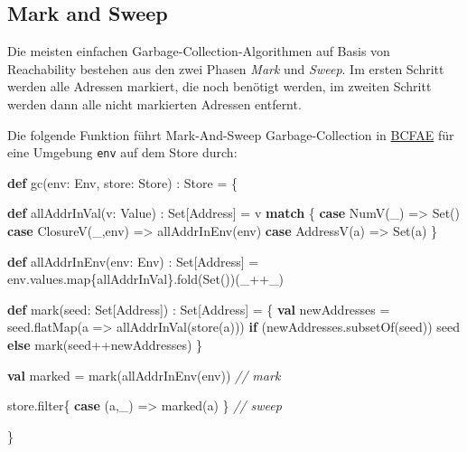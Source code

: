 \documentclass[]{article}
\newenvironment{Shaded}{}{}
\newcommand{\CommentTok}[1]{\textcolor[rgb]{0.38,0.63,0.69}{\textit{#1}}}
\newcommand{\FunctionTok}[1]{\textcolor[rgb]{0.02,0.16,0.49}{#1}}
\newcommand{\KeywordTok}[1]{\textcolor[rgb]{0.00,0.44,0.13}{\textbf{#1}}}
\newcommand{\NormalTok}[1]{#1}
\begin{document}
\hypertarget{mark-and-sweep}{%
\subsection{Mark and Sweep}\label{mark-and-sweep}}

Die meisten einfachen Garbage-Collection-Algorithmen auf Basis von
Reachability bestehen aus den zwei Phasen \emph{Mark} und \emph{Sweep}.
Im ersten Schritt werden alle Adressen markiert, die noch benötigt
werden, im zweiten Schritt werden dann alle nicht markierten Adressen
entfernt.

Die folgende Funktion führt Mark-And-Sweep Garbage-Collection in
\protect\hyperlink{mutation-bcfae}{BCFAE} für eine Umgebung \texttt{env}
auf dem Store durch:

\begin{Shaded}
\begin{Highlighting}[]
\KeywordTok{def} \FunctionTok{gc}\NormalTok{(env: Env, store: Store) : Store = \{}

  \KeywordTok{def} \FunctionTok{allAddrInVal}\NormalTok{(v: Value) : Set[Address] = v }\KeywordTok{match}\NormalTok{ \{}
    \KeywordTok{case} \FunctionTok{NumV}\NormalTok{(\_) =\textgreater{} Set()}
    \KeywordTok{case} \FunctionTok{ClosureV}\NormalTok{(\_,env) =\textgreater{} }\FunctionTok{allAddrInEnv}\NormalTok{(env)}
    \KeywordTok{case} \FunctionTok{AddressV}\NormalTok{(a) =\textgreater{} Set(a)}
\NormalTok{  \}}

  \KeywordTok{def} \FunctionTok{allAddrInEnv}\NormalTok{(env: Env) : Set[Address] =}
\NormalTok{    env.}\FunctionTok{values}\NormalTok{.}\FunctionTok{map}\NormalTok{\{allAddrInVal\}.}\FunctionTok{fold}\NormalTok{(Set())(\_++\_)}

  \KeywordTok{def} \FunctionTok{mark}\NormalTok{(seed: Set[Address]) : Set[Address] = \{}
    \KeywordTok{val}\NormalTok{ newAddresses = seed.}\FunctionTok{flatMap}\NormalTok{(a =\textgreater{} }\FunctionTok{allAddrInVal}\NormalTok{(}\FunctionTok{store}\NormalTok{(a)))}
    \KeywordTok{if}\NormalTok{ (newAddresses.}\FunctionTok{subsetOf}\NormalTok{(seed)) seed }\KeywordTok{else} \FunctionTok{mark}\NormalTok{(seed++newAddresses)}
\NormalTok{  \}}

  \KeywordTok{val}\NormalTok{ marked = }\FunctionTok{mark}\NormalTok{(}\FunctionTok{allAddrInEnv}\NormalTok{(env)) }\CommentTok{// mark}
  
\NormalTok{  store.}\FunctionTok{filter}\NormalTok{\{ }\KeywordTok{case}\NormalTok{ (a,\_) =\textgreater{} }\FunctionTok{marked}\NormalTok{(a) \} }\CommentTok{// sweep}

\NormalTok{\}}
\end{Highlighting}
\end{Shaded}
\end{document}

